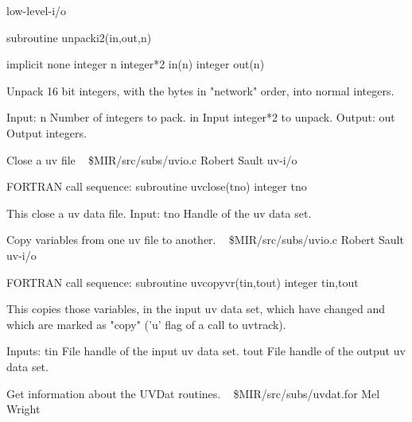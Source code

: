 \newline {} low-level-i/o
\par{\tenpoint
{\eightpoint\begintt
        subroutine unpacki2(in,out,n)

        implicit none
        integer n
        integer*2 in(n)
        integer out(n)

  Unpack 16 bit integers, with the bytes in "network" order, into normal
  integers.

  Input:
    n          Number of integers to pack.
    in         Input integer*2 to unpack.
  Output:
    out        Output integers.
\endtt}
\par}
%
\noindent Close a uv file
\newline \ 
\newline {} \$MIR/src/subs/uvio.c
\newline {} Robert Sault
\newline {} uv-i/o
\par{\tenpoint
{\eightpoint\begintt
FORTRAN call sequence:
        subroutine uvclose(tno)
        integer tno

  This close a uv data file.
  Input:
    tno         Handle of the uv data set.                              
\endtt}
\par}
%
\noindent Copy variables from one uv file to another.
\newline \ 
\newline {} \$MIR/src/subs/uvio.c
\newline {} Robert Sault
\newline \abox{Keywords:} uv-i/o
\par{\tenpoint
{\eightpoint\begintt
FORTRAN call sequence:
        subroutine uvcopyvr(tin,tout)
        integer tin,tout

  This copies those variables, in the input uv data set, which have
  changed and which are marked as "copy" ('u' flag of a call to uvtrack).

  Inputs:
    tin         File handle of the input uv data set.
    tout        File handle of the output uv data set.                  
\endtt}
\par}
%
\noindent Get information about the UVDat routines.
\newline \ 
\newline {} \$MIR/src/subs/uvdat.for
\newline \abox{Responsible:} Mel Wright

